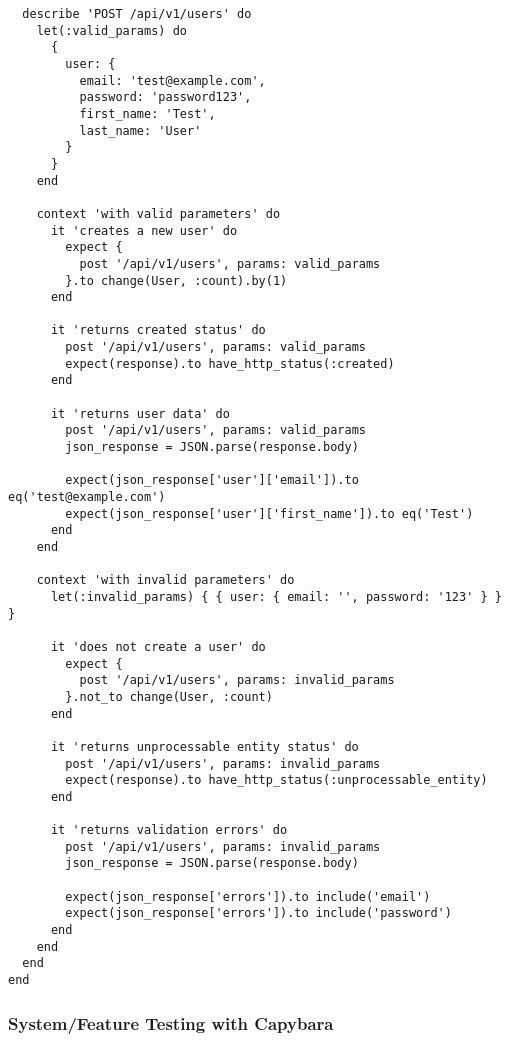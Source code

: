 \documentclass[12pt,a4paper]{article}
\begin{document}
\begin{lstlisting}
  describe 'POST /api/v1/users' do
    let(:valid_params) do
      {
        user: {
          email: 'test@example.com',
          password: 'password123',
          first_name: 'Test',
          last_name: 'User'
        }
      }
    end

    context 'with valid parameters' do
      it 'creates a new user' do
        expect {
          post '/api/v1/users', params: valid_params
        }.to change(User, :count).by(1)
      end

      it 'returns created status' do
        post '/api/v1/users', params: valid_params
        expect(response).to have_http_status(:created)
      end

      it 'returns user data' do
        post '/api/v1/users', params: valid_params
        json_response = JSON.parse(response.body)
        
        expect(json_response['user']['email']).to eq('test@example.com')
        expect(json_response['user']['first_name']).to eq('Test')
      end
    end

    context 'with invalid parameters' do
      let(:invalid_params) { { user: { email: '', password: '123' } } }

      it 'does not create a user' do
        expect {
          post '/api/v1/users', params: invalid_params
        }.not_to change(User, :count)
      end

      it 'returns unprocessable entity status' do
        post '/api/v1/users', params: invalid_params
        expect(response).to have_http_status(:unprocessable_entity)
      end

      it 'returns validation errors' do
        post '/api/v1/users', params: invalid_params
        json_response = JSON.parse(response.body)
        
        expect(json_response['errors']).to include('email')
        expect(json_response['errors']).to include('password')
      end
    end
  end
end
\end{lstlisting}

\subsubsection{System/Feature Testing with Capybara}
\end{document}
